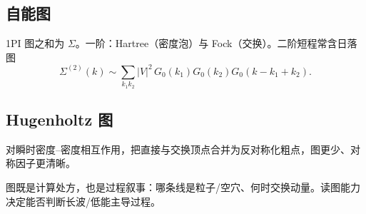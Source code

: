 \subsection{自能图}

1PI 图之和为 $\Sigma$。一阶：Hartree（密度泡）与 Fock（交换）。二阶短程常含日落图
\begin{equation}
  \Sigma^{(2)}(k)
  \sim
  \sum_{k_1k_2}
  |V|^2\,
  G_0(k_1)G_0(k_2)G_0(k-k_1+k_2).
\end{equation}

\subsection{Hugenholtz 图}

对瞬时密度--密度相互作用，把直接与交换顶点合并为反对称化粗点，图更少、对称因子更清晰。

\begin{note}
图既是计算处方，也是过程叙事：哪条线是粒子/空穴、何时交换动量。读图能力决定能否判断长波/低能主导过程。
\end{note}
